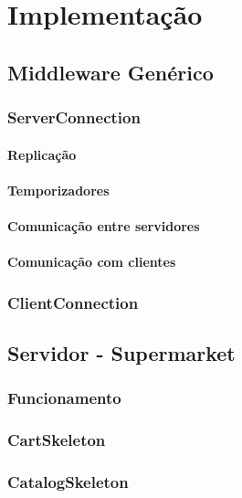 \documentclass[a4paper]{report}
\begin{document}
\chapter{Implementação} \label{ch:Implementation}
\large{
	\section{Middleware Genérico} \label{sec:Middleware}
		\subsection{ServerConnection} \label{subsec:ServerConnection}
			\subsubsection{Replicação} \label{subsec:Replication}
			\subsubsection{Temporizadores} \label{subsec:Timers}
			\subsubsection{Comunicação entre servidores} \label{subsec:ServerCommunication}
			\subsubsection{Comunicação com clientes} \label{subsec:ClientCommunication}
		\subsection{ClientConnection} \label{subsec:ClientConnection}
	
	\section{Servidor - Supermarket} \label{sec:Server}
		\subsection{Funcionamento} \label{subsec:ServerWorking}
		\subsection{CartSkeleton} \label{subsec:ServerCartSkeleton}
		\subsection{CatalogSkeleton} \label{subsec:ServerCatalogSkeleton}
	
}
\end{document}
